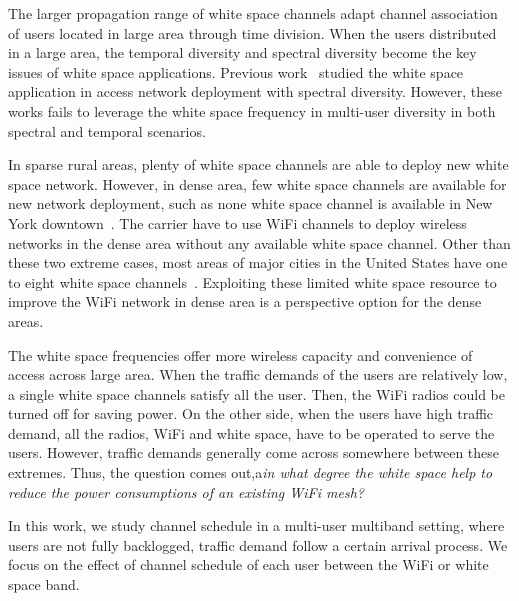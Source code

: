 The larger propagation range of white space channels adapt channel association of users located 
in large area through time division. When the users distributed in a large area, the temporal 
diversity and spectral diversity become the key issues of white space applications.
Previous work~\cite{pcuiwinmee} studied the white space application in access network deployment 
with spectral diversity. However, these works fails to leverage the white space frequency in 
multi-user diversity in both spectral and temporal scenarios.

In sparse rural areas, plenty of white space channels are able to deploy new white space network. However, 
in dense area, few white space channels are available for new network deployment, such as none white 
space channel is available in New York downtown~\cite{googlespectrum}. The carrier have to use WiFi 
channels to deploy wireless networks in the dense area without any available white space channel. 
Other than these two extreme cases, most areas of major cities in the United States have one to eight 
white space channels~\cite{googlespectrum}. Exploiting these limited white space resource to improve 
the WiFi network in dense area is a perspective option for the dense areas.

The white space frequencies offer more wireless capacity and convenience of access across large 
area. When the traffic demands of the users are relatively low, a single white space channels satisfy 
all the user. Then, the WiFi radios could be turned off for saving power. On the other side, 
when the users have high traffic demand, all the radios, WiFi and white space, have to be operated to serve the users. 
However, traffic demands generally come across somewhere between these extremes.
Thus, the question comes out,a{\it in what degree the white space help to reduce the power consumptions of 
an existing WiFi mesh?} 

In this work, we study channel schedule in a multi-user multiband setting, where users are not 
fully backlogged, traffic demand follow a certain arrival process. We focus on the effect of channel 
schedule of each user between the WiFi or white space band. 


